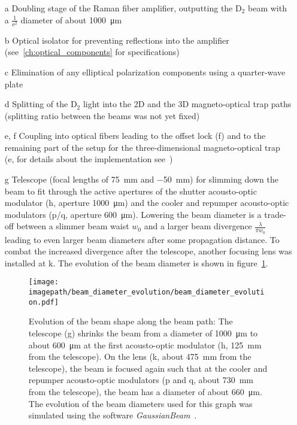 \begin{itemize}
    \item[a] Doubling stage of the Raman fiber amplifier, outputting the D$_2$ beam with a $\frac{1}{\text{e}^2}$ diameter of about \SI{1000}{\micro\meter}

    \item[b] Optical isolator for preventing reflections into the amplifier (see~\ref{ch:optical_components} for specifications)

    \item[c] Elimination of any elliptical polarization components using a quarter-wave plate

    \item[d] Splitting of the D$_2$ light into the 2D and the 3D magneto-optical trap paths (splitting ratio between the beams was not yet fixed)

    \item[e, f] Coupling into optical fibers leading to the offset lock (f) and to the remaining part of the setup for the three-dimensional magneto-optical trap (e, for details about the implementation see~\cite{qesja_notitle_2022})
    
    \item[g] Telescope (focal lengths of \SI[]{+75}{\milli\meter} and \SI[]{-50}{\milli\meter}) for slimming down the beam to fit through the active apertures of the shutter acousto-optic modulator (h, aperture \SI[]{1000}{\micro\meter}) and the cooler and repumper acousto-optic modulators (p/q, aperture \SI[]{600}{\micro\meter}). Lowering the beam diameter is a trade-off between a slimmer beam waist $w_0$ and a larger beam divergence $\frac{\lambda}{\pi w_0}$ leading to even larger beam diameters after some propagation distance. To combat the increased divergence after the telescope, another focusing lens was installed at k. The evolution of the beam diameter is shown in figure~\ref{fig:beam_diameter_evolution}.
    
\begin{figure}
    \centering
    \texttt{[image: \\imagepath/beam\_diameter\_evolution/beam\_diameter\_evolution.pdf]}
    \caption{Evolution of the beam shape along the beam path: The telescope (g) shrinks the beam from a diameter of \SI[]{1000}{\micro\meter} to about \SI[]{600}{\micro\meter} at the first acousto-optic modulator (h, \SI[]{125}{\milli\meter} from the telescope). On the lens (k, about \SI{475}{\milli\meter} from the telescope), the beam is focused again such that at the cooler and repumper acousto-optic modulators (p and q, about \SI[]{730}{\milli\meter} from the telescope), the beam has a diameter of about \SI[]{660}{\micro\meter}. The evolution of the beam diameters used for this graph was simulated using the software \textit{GaussianBeam}~\cite{noauthor_gaussianbeam_nodate}.}
    \label{fig:beam_diameter_evolution}
\end{figure}


\end{itemize}
